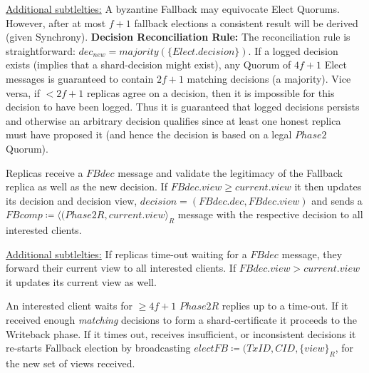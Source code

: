 \underline{Additional subtlelties:} A byzantine Fallback may equivocate Elect Quorums. However, after at most $f+1$ fallback elections a consistent result will be derived (given Synchrony).
\textbf{Decision Reconciliation Rule:} The reconciliation rule is straightforward: $dec_{new} = majority(\{Elect.decision\})$. If a logged decision exists (implies that a shard-decision might exist), any Quorum of $4f+1$ Elect messages is guaranteed to contain $2f+1$ matching decisions (a majority). Vice versa, if $<2f+1$ replicas agree on a decision, then it is impossible for this decision to have been logged. Thus it is guaranteed that logged decisions persists and otherwise an arbitrary decision qualifies since at least one honest replica must have proposed it (and hence the decision is based on a legal $Phase2$ Quorum).


Replicas receive a $FBdec$ message and validate the legitimacy of the Fallback replica as well as the new decision. If $FBdec.view \geq current.view$ it then updates its decision and decision view, $decision = (FBdec.dec, FBdec.view)$ and sends a $FBcomp \coloneqq \langle(Phase2R, current.view\rangle_R$ message with the respective decision to all interested clients.

\underline{Additional subtlelties:} If replicas time-out waiting for a $FBdec$ message, they forward their current view to all interested clients. If $FBdec.view > current.view$ it updates its current view as well.

An interested client waits for $\geq 4f+1$ $Phase2R$ replies up to a time-out. If it received enough \textit{matching} decisions to form a shard-certificate it proceeds to the Writeback phase. If it times out, receives insufficient, or inconsistent decisions it re-starts Fallback election by broadcasting $electFB \coloneqq (TxID, CID, \{view\}_R$, for the new set of views received.

